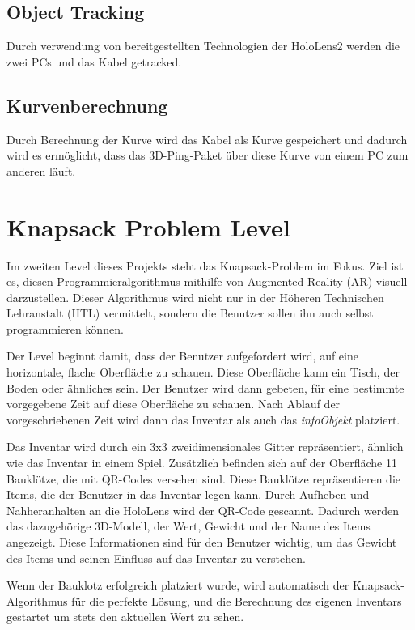 \subsection{Object Tracking}
Durch verwendung von bereitgestellten Technologien der HoloLens2
werden die zwei PCs und das Kabel getracked.

\subsection{Kurvenberechnung}
Durch Berechnung der Kurve wird das Kabel als Kurve gespeichert
und dadurch wird es ermöglicht, dass das 3D-Ping-Paket über diese
Kurve von einem PC zum anderen läuft.

\section{Knapsack Problem Level}
Im zweiten Level dieses Projekts steht das Knapsack-Problem im Fokus.
Ziel ist es, diesen Programmieralgorithmus mithilfe von Augmented Reality
(AR) visuell darzustellen. Dieser Algorithmus wird nicht nur in der Höheren
Technischen Lehranstalt (HTL) vermittelt, sondern die Benutzer sollen
ihn auch selbst programmieren können.

Der Level beginnt damit, dass der Benutzer aufgefordert wird, auf eine
horizontale, flache Oberfläche zu schauen. Diese Oberfläche kann ein Tisch,
der Boden oder ähnliches sein. Der Benutzer wird dann gebeten, für eine bestimmte
vorgegebene Zeit auf diese Oberfläche zu schauen. Nach Ablauf der vorgeschriebenen
Zeit wird dann das Inventar als auch das \textit{infoObjekt} platziert.

Das Inventar wird durch ein 3x3 zweidimensionales Gitter repräsentiert, ähnlich
wie das Inventar in einem Spiel. Zusätzlich befinden sich auf der Oberfläche 11 Bauklötze,
die mit QR-Codes versehen sind. Diese Bauklötze repräsentieren die Items, die der Benutzer
in das Inventar legen kann. Durch Aufheben und Nahheranhalten an die HoloLens wird der QR-Code gescannt.
Dadurch werden das dazugehörige 3D-Modell, der Wert, Gewicht und der Name des Items angezeigt.
Diese Informationen sind für den Benutzer wichtig, um das Gewicht des Items und
seinen Einfluss auf das Inventar zu verstehen.

Wenn der Bauklotz erfolgreich platziert wurde, wird automatisch der Knapsack-Algorithmus für die perfekte Lösung,
und die Berechnung des eigenen Inventars gestartet um stets den aktuellen Wert zu sehen.


